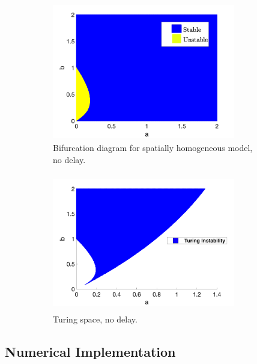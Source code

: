 \documentclass[12pt]{report}
\begin{document}
\begin{figure}[H]
    \centering
    \begin{subfigure}[b]{0.45\textwidth}
        \centering
        \includegraphics[width=8cm,height = 6cm]{bifsh.png}
        \caption{Bifurcation diagram for spatially homogeneous model, no delay.}
        \label{fig:bifsh}
    \end{subfigure}
    \hfill
    \begin{subfigure}[b]{0.45\textwidth}
        \centering
        \includegraphics[width=8cm,height = 6cm]{turingspace.png}
        \caption{Turing space, no delay.}
        \label{fig:turingspace}
    \end{subfigure}
    \caption{}
    \label{fig:dispfixed}
\end{figure}

\subsection{Numerical Implementation}\label{section:numimp}
\end{document}
